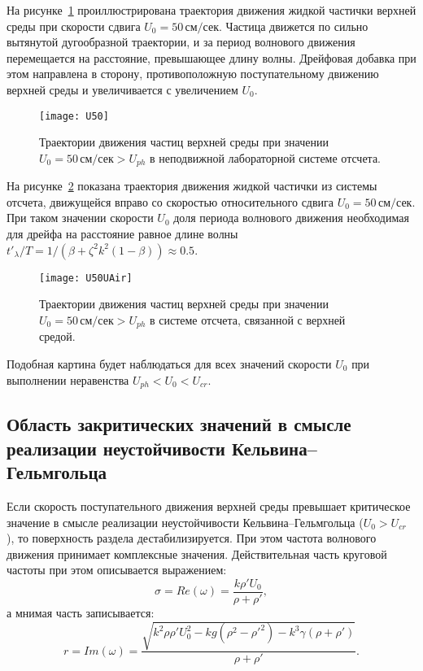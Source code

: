 На рисунке~\ref{fig:Traj6} проиллюстрирована траектория движения жидкой частички верхней среды при скорости сдвига $ U_{0}=50\, \text{см/сек} $. Частица движется по сильно вытянутой дугообразной траектории, и за период волнового движения перемещается на расстояние, превышающее длину волны. Дрейфовая добавка при этом направлена в сторону, противоположную поступательному движению верхней среды и увеличивается с увеличением $ U_{0} $. 
\begin{figure}[ht]
\centering
\texttt{[image: U50]}
\caption{Траектории движения частиц верхней среды при значении $ U_{0}=50\, \text{см/сек}>U_{ph} $ в неподвижной лабораторной системе отсчета.}\label{fig:Traj6}
\end{figure}
На рисунке~\ref{fig:Traj7} показана траектория движения жидкой частички из системы отсчета, движущейся вправо со скоростью относительного сдвига $ U_{0}=50\, \text{см/сек} $. При таком значении скорости $ U_{0} $ доля периода волнового движения необходимая для дрейфа на расстояние равное длине волны $ t'_{\lambda}/T=1/\left( \beta+\zeta^{2}k^{2}\left( 1-\beta \right) \right) \approx 0.5 $. 
\begin{figure}[ht]
\centering
\texttt{[image: U50UAir]}
\caption{Траектории движения частиц верхней среды при значении $ U_{0}=50\, \text{см/сек}>U_{ph} $ в системе отсчета, связанной с верхней средой.}\label{fig:Traj7}
\end{figure}
Подобная картина будет наблюдаться для всех значений скорости $ U_{0} $ при выполнении неравенства $ U_{ph}<U_{0}<U_{cr} $.


\newpage
\subsection{Область закритических значений в смысле реализации неустойчивости Кельвина--Гельмгольца}
\label{Sec:Zacr}

Если скорость поступательного движения верхней среды превышает критическое значение в смысле реализации неустойчивости Кельвина--Гельмгольца ($ U_{0}>U_{cr} $ ), то поверхность раздела дестабилизируется. При этом частота волнового движения  принимает комплексные значения. Действительная часть круговой частоты при этом описывается выражением:
\begin{equation*}
\sigma = Re\left( \omega \right)= \dfrac{k \rho' U_{0}}{\rho+\rho'}, 
\end{equation*}
а мнимая часть записывается:
\begin{equation*}
r=Im \left( \omega \right)=\dfrac{\sqrt{k^{2}\rho \rho' U^{2}_{0}-k g \left( \rho^{2}-\rho'^{2} \right) -k^{3} \gamma \left( \rho+\rho' \right)}}{\rho+\rho'}.
\end{equation*}

